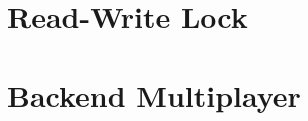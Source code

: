 \documentclass[a4paper,12pt, nofootinbib]{article}
\begin{document}
\maketitle

\tableofcontents
\newpage

\section{Read-Write Lock}



\section{Backend Multiplayer}

\end{document}
